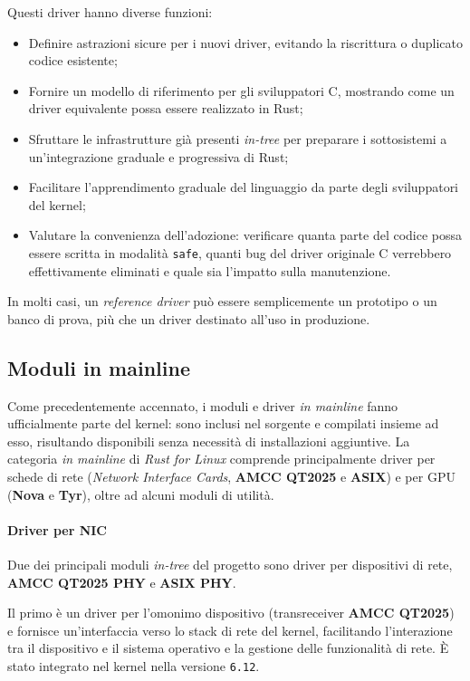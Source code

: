 \noindent Questi driver hanno diverse funzioni:
\begin{itemize}
    \item Definire astrazioni sicure per i nuovi driver, evitando la riscrittura o duplicato codice esistente;
    \item Fornire un modello di riferimento per gli sviluppatori C, mostrando come un driver equivalente possa essere realizzato in Rust;
    \item Sfruttare le infrastrutture già presenti \textit{in-tree} per preparare i sottosistemi a un'integrazione graduale e progressiva di Rust;
    \item Facilitare l'apprendimento graduale del linguaggio da parte degli sviluppatori del kernel;
    \item Valutare la convenienza dell'adozione: verificare quanta parte del codice possa essere scritta in modalità \texttt{safe}, quanti bug del driver originale C verrebbero effettivamente eliminati e quale sia l'impatto sulla manutenzione.
\end{itemize}
In molti casi, un \textit{reference driver} può essere semplicemente un prototipo o un banco di prova, più che un driver destinato all'uso in produzione.

\subsection{Moduli in mainline}
Come precedentemente accennato, i moduli e driver \textit{in mainline} fanno ufficialmente parte del kernel: sono inclusi nel 
sorgente e compilati insieme ad esso, risultando disponibili senza necessità di installazioni aggiuntive.
La categoria \textit{in mainline} di \textit{Rust for Linux} comprende principalmente driver per schede di rete (\textit{Network Interface Cards}, \textbf{AMCC QT2025} e \textbf{ASIX}) e per GPU (\textbf{Nova} e \textbf{Tyr}), oltre ad 
alcuni moduli di utilità.

\paragraph{Driver per NIC}
Due dei principali moduli \textit{in-tree} del progetto sono driver per dispositivi di rete, \textbf{AMCC QT2025 PHY} e \textbf{ASIX PHY}.\ 

Il primo è un driver per l'omonimo dispositivo (transreceiver \textbf{AMCC QT2025}) e fornisce un'interfaccia verso lo 
stack di rete del kernel, facilitando l'interazione tra 
il dispositivo e il sistema operativo e la gestione delle funzionalità di rete.
È stato integrato nel kernel nella versione \texttt{6.12}.


